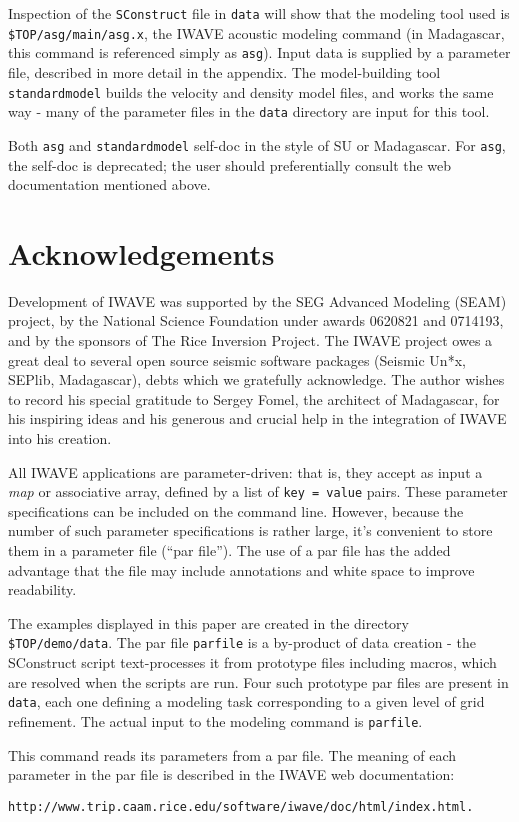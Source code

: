 Inspection of the {\tt SConstruct} file in {\tt data} will show that
the modeling tool used is {\tt \$TOP/asg/main/asg.x}, the IWAVE
acoustic modeling command (in Madagascar, this command is referenced
simply as {\tt asg}). Input data is supplied by a parameter file,
described in more detail in the appendix.
The model-building tool {\tt standardmodel} builds the velocity and
density model files, and works the same way - many of the parameter
files in the {\tt data} directory are input for this tool.

Both {\tt asg} and {\tt standardmodel} self-doc in the style of SU or
Madagascar. For {\tt asg}, the self-doc is deprecated; the user should
preferentially consult the web documentation mentioned above.

\section{Acknowledgements}
Development of IWAVE was supported by the SEG Advanced Modeling (SEAM)
project, by the National Science Foundation under awards 0620821 and
0714193, and by the sponsors of The Rice Inversion Project. The IWAVE
project owes a great deal to several open source seismic software
packages (Seismic Un*x, SEPlib, Madagascar), debts which we gratefully
acknowledge. The author wishes to record his special gratitude to
Sergey Fomel, the architect of Madagascar, for his inspiring ideas and
his generous and crucial help in the integration of IWAVE into his
creation.





All IWAVE applications are parameter-driven: that is, they accept as
input a {\em map} or associative array, defined by 
a list of {\tt key = value} pairs. These parameter specifications can
be included on the command line. However, because the number of such
parameter specifications is rather large, it's convenient to store
them in a parameter file (``par file''). The use of a par file has the
added advantage that the file may include annotations and white space to
improve readability. 

The examples displayed in this paper are created in the directory {\tt
  \$TOP/demo/data}. The par file {\tt parfile} is a by-product of data
creation - the SConstruct script text-processes it from prototype
files including macros, which are resolved when the scripts are
run. Four such prototype par files are present in {\tt data}, each one defining
a modeling task corresponding to a given level of grid refinement. 
The actual input to the modeling command is {\tt parfile}. 


This command reads its parameters from a
par file. The
meaning of each parameter in the par file is described in the IWAVE
web documentation:
\begin{verbatim}
http://www.trip.caam.rice.edu/software/iwave/doc/html/index.html.
\end{verbatim}

